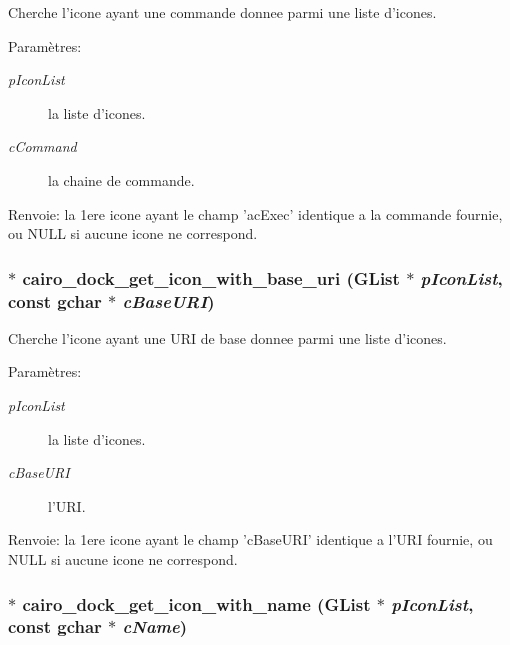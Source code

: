 Cherche l'icone ayant une commande donnee parmi une liste d'icones. \begin{Desc}
\item[Paramètres:]
\begin{description}
\item[{\em pIconList}]la liste d'icones. \item[{\em cCommand}]la chaine de commande. \end{description}
\end{Desc}
\begin{Desc}
\item[Renvoie:]la 1ere icone ayant le champ 'acExec' identique a la commande fournie, ou NULL si aucune icone ne correspond. \end{Desc}
\subsubsection{$\ast$ cairo\_\-dock\_\-get\_\-icon\_\-with\_\-base\_\-uri (GList $\ast$ {\em pIconList}, const gchar $\ast$ {\em cBaseURI})}\label{cairo-dock-icons_8h_69a58cbad5053a3565a1af4a3463c8bd}


Cherche l'icone ayant une URI de base donnee parmi une liste d'icones. \begin{Desc}
\item[Paramètres:]
\begin{description}
\item[{\em pIconList}]la liste d'icones. \item[{\em cBaseURI}]l'URI. \end{description}
\end{Desc}
\begin{Desc}
\item[Renvoie:]la 1ere icone ayant le champ 'cBaseURI' identique a l'URI fournie, ou NULL si aucune icone ne correspond. \end{Desc}
\subsubsection{$\ast$ cairo\_\-dock\_\-get\_\-icon\_\-with\_\-name (GList $\ast$ {\em pIconList}, const gchar $\ast$ {\em cName})}\label{cairo-dock-icons_8h_dc3370183c80eae97354fa58f735c567}


